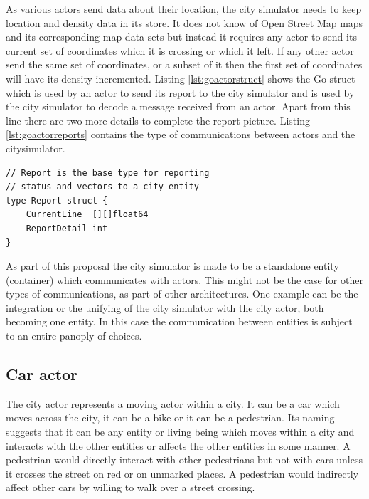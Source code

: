 \documentclass[conference]{IEEEtran}
\begin{document}
As various actors send data about their location, the city simulator needs to keep location and density data in its store. It does not know of Open Street Map maps and its corresponding map data sets but instead it requires any actor to send its current set of coordinates which it is crossing or which it left. If any other actor send the same set of coordinates, or a subset of it then the first set of coordinates will have its density incremented. Listing \ref{lst:goactorstruct} shows the Go struct which is used by an actor to send its report to the city simulator and is used by the city simulator to decode a message received from an actor. Apart from this line there are two more details to complete the report picture. Listing \ref{lst:goactorreports} contains the type of communications between actors and the citysimulator.

\begin{lstlisting}[caption=Go struct for actor's report, label=lst:goactorstruct]
// Report is the base type for reporting
// status and vectors to a city entity
type Report struct {
	CurrentLine  [][]float64
	ReportDetail int
}
\end{lstlisting}

As part of this proposal the city simulator is made to be a standalone entity (container) which communicates with actors. This might not be the case for other types of communications, as part of other architectures. One example can be the integration or the unifying of the city simulator with the city actor, both becoming one entity. In this case the communication between entities is subject to an entire panoply of choices.

\subsection{Car actor}

The city actor represents a moving actor within a city. It can be a car which moves across the city, it can be a bike or it can be a pedestrian. Its naming suggests that it can be any entity or living being which moves within a city and interacts with the other entities or affects the other entities in some manner. A pedestrian would directly interact with other pedestrians but not with cars unless it crosses the street on red or on unmarked places. A pedestrian would indirectly affect other cars by willing to walk over a street crossing.
\end{document}
